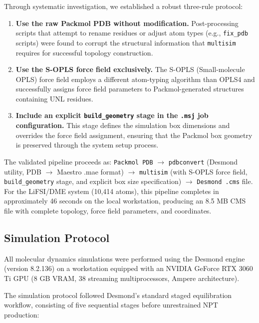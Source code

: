 \documentclass[twocolumn,10pt]{article}
\begin{document}
Through systematic investigation, we established a robust three-rule protocol:

\begin{enumerate}[leftmargin=*, itemsep=4pt, label=\textbf{Rule \arabic*:}]
    \item \textbf{Use the raw Packmol PDB without modification.} Post-processing scripts that attempt to rename residues or adjust atom types (e.g., \texttt{fix\_pdb} scripts) were found to corrupt the structural information that \texttt{multisim} requires for successful topology construction.
    \item \textbf{Use the S-OPLS force field exclusively.} The S-OPLS (Small-molecule OPLS) force field employs a different atom-typing algorithm than OPLS4 and successfully assigns force field parameters to Packmol-generated structures containing UNL residues.
    \item \textbf{Include an explicit \texttt{build\_geometry} stage in the \texttt{.msj} job configuration.} This stage defines the simulation box dimensions and overrides the force field assignment, ensuring that the Packmol box geometry is preserved through the system setup process.
\end{enumerate}

The validated pipeline proceeds as: \texttt{Packmol PDB} $\rightarrow$ \texttt{pdbconvert} (Desmond utility, PDB $\rightarrow$ Maestro .mae format) $\rightarrow$ \texttt{multisim} (with S-OPLS force field, \texttt{build\_geometry} stage, and explicit box size specification) $\rightarrow$ \texttt{Desmond .cms} file. For the LiFSI/DME system (10,414 atoms), this pipeline completes in approximately 46 seconds on the local workstation, producing an 8.5 MB CMS file with complete topology, force field parameters, and coordinates.

\subsection{Simulation Protocol}
All molecular dynamics simulations were performed using the Desmond engine (version 8.2.136) on a workstation equipped with an NVIDIA GeForce RTX 3060 Ti GPU (8 GB VRAM, 38 streaming multiprocessors, Ampere architecture).

The simulation protocol followed Desmond's standard staged equilibration workflow, consisting of five sequential stages before unrestrained NPT production:
\end{document}
